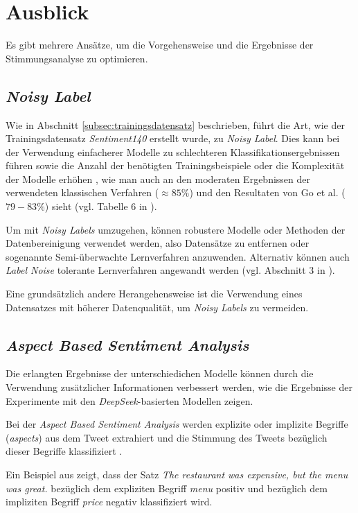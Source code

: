 \section{Ausblick}\label{sec:ausblick}

Es gibt mehrere Ansätze, um die Vorgehensweise und die Ergebnisse der Stimmungsanalyse zu optimieren.

\subsection{\textit{Noisy Label}}
Wie in Abschnitt \ref{subsec:trainingsdatensatz} beschrieben, führt die Art, wie der Trainingsdatensatz \textit{Sentiment140} erstellt wurde, zu \textit{Noisy Label}.
Dies kann bei der Verwendung einfacherer Modelle zu schlechteren Klassifikationsergebnissen führen sowie die Anzahl der benötigten Trainingsbeispiele oder die Komplexität der Modelle erhöhen \cite{NoisyLabel2014}, wie man auch an den moderaten Ergebnissen der verwendeten klassischen Verfahren ($\approx{85}\%$) und den Resultaten von Go et al. ($79-83\%$) sieht (vgl. Tabelle 6 in \cite{go2009twitter}).

Um mit \textit{Noisy Labels} umzugehen, können robustere Modelle oder Methoden der Datenbereinigung verwendet werden, also Datensätze zu entfernen oder sogenannte Semi-überwachte Lernverfahren anzuwenden. Alternativ können auch \textit{Label Noise} tolerante Lernverfahren angewandt werden (vgl. Abschnitt 3 in \cite{NoisyLabel2014}).

Eine grundsätzlich andere Herangehensweise ist die Verwendung eines Datensatzes mit höherer Datenqualität, um \textit{Noisy Labels} zu vermeiden.

\subsection{\textit{Aspect Based Sentiment Analysis}}

Die erlangten Ergebnisse der unterschiedichen Modelle können durch die Verwendung zusätzlicher Informationen verbessert werden, wie die Ergebnisse der Experimente mit den \textit{DeepSeek}-basierten Modellen zeigen.

Bei der \textit{Aspect Based Sentiment Analysis} werden explizite oder implizite Begriffe (\textit{aspects}) aus dem Tweet extrahiert und die Stimmung des Tweets bezüglich dieser Begriffe klassifiziert \cite{Hua_2024}.

Ein Beispiel aus \cite{Hua_2024} zeigt, dass der Satz \glqq \textit{The restaurant was expensive, but the menu was great.}\grqq{} bezüglich dem expliziten Begriff \textit{menu} positiv und bezüglich dem impliziten Begriff \textit{price} negativ klassifiziert wird.

